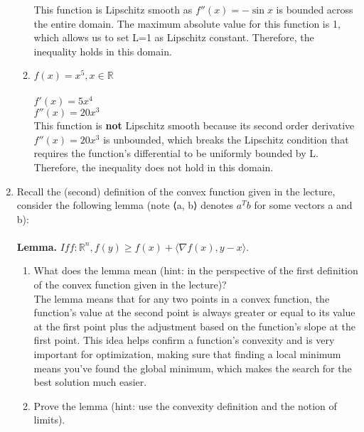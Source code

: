 \documentclass{assignment}
\newcommand{\R}{\mathbb{R}}
\begin{document}
\begin{problem}
\begin{enumerate}
\begin{enumerate}
    This function is Lipschitz smooth as $f''(x) = -\sin x$ is bounded across the entire domain. The maximum absolute value for this function is 1, which allows us to set L=1 as Lipschitz constant. Therefore, the inequality holds in this domain.\\

    \item $f(x) = x^5, x \in \R$\\\\
    $f'(x) = 5x^4$\\
    $f''(x) = 20x^3$\\

    This function is \textbf{not} Lipschitz smooth because its second order derivative $f''(x) = 20x^3$ is unbounded, which breaks the Lipschitz condition that requires the function's differential to be uniformly bounded by L. Therefore, the inequality does not hold in this domain.\\
    
\end{enumerate}
\item Recall the (second) definition of the convex function given in the lecture, consider the following lemma (note ⟨a, b⟩ denotes $a^Tb$ for some vectors a and b):\\\\
\textbf{Lemma.} $If  f : \R^n, f(y) \geq f(x) + \langle \nabla f(x), y-x\rangle.$\\


\begin{enumerate}
    
    \item What does the lemma mean (hint: in the perspective of the first definition of the convex function given in the lecture)?\\

    The lemma means that for any two points in a convex function, the function's value at the second point is always greater or equal to its value at the first point plus the adjustment based on the function's slope at the first point. This idea helps confirm a function's convexity and is very important for optimization, making sure that finding a local minimum means you've found the global minimum, which makes the search for the best solution much easier.\\
    
    \item Prove the lemma (hint: use the convexity definition and the notion of limits).\\


\end{enumerate}
\end{enumerate}
\end{problem}
\end{document}
